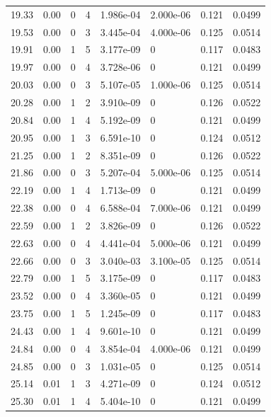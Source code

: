 \documentclass[preview]{standalone}
\begin{document}
{{{\begin{tabular}{L{1.2cm}C{1.2cm} C{0.3cm}C{0.5cm} C{1.4cm}C{1.4cm} C{1.4cm}C{1.4cm}}
  19.33  &  0.00  & 0     &  4 &  1.986e-04  & 2.000e-06  & 0.121 &  0.0499   \\ 
  19.53  &  0.00  & 0     &  3 &  3.445e-04  & 4.000e-06  & 0.125 &  0.0514   \\ 
  19.91  &  0.00  & 1     &  5 &  3.177e-09  & 0  & 0.117 &  0.0483   \\ 
  19.97  &  0.00  & 0     &  4 &  3.728e-06  & 0  & 0.121 &  0.0499   \\ 
  20.03  &  0.00  & 0     &  3 &  5.107e-05  & 1.000e-06  & 0.125 &  0.0514   \\ 
  20.28  &  0.00  & 1     &  2 &  3.910e-09  & 0  & 0.126 &  0.0522   \\ 
  20.84  &  0.00  & 1     &  4 &  5.192e-09  & 0  & 0.121 &  0.0499   \\ 
  20.95  &  0.00  & 1     &  3 &  6.591e-10  & 0  & 0.124 &  0.0512   \\ 
  21.25  &  0.00  & 1     &  2 &  8.351e-09  & 0  & 0.126 &  0.0522   \\ 
  21.86  &  0.00  & 0     &  3 &  5.207e-04  & 5.000e-06  & 0.125 &  0.0514   \\ 
  22.19  &  0.00  & 1     &  4 &  1.713e-09  & 0  & 0.121 &  0.0499   \\ 
  22.38  &  0.00  & 0     &  4 &  6.588e-04  & 7.000e-06  & 0.121 &  0.0499   \\ 
  22.59  &  0.00  & 1     &  2 &  3.826e-09  & 0  & 0.126 &  0.0522   \\ 
  22.63  &  0.00  & 0     &  4 &  4.441e-04  & 5.000e-06  & 0.121 &  0.0499   \\ 
  22.66  &  0.00  & 0     &  3 &  3.040e-03  & 3.100e-05  & 0.125 &  0.0514   \\ 
  22.79  &  0.00  & 1     &  5 &  3.175e-09  & 0  & 0.117 &  0.0483   \\ 
  23.52  &  0.00  & 0     &  4 &  3.360e-05  & 0  & 0.121 &  0.0499   \\ 
  23.75  &  0.00  & 1     &  5 &  1.245e-09  & 0  & 0.117 &  0.0483   \\ 
  24.43  &  0.00  & 1     &  4 &  9.601e-10  & 0  & 0.121 &  0.0499   \\ 
  24.84  &  0.00  & 0     &  4 &  3.854e-04  & 4.000e-06  & 0.121 &  0.0499   \\ 
  24.85  &  0.00  & 0     &  3 &  1.031e-05  & 0  & 0.125 &  0.0514   \\ 
  25.14  &  0.01  & 1     &  3 &  4.271e-09  & 0  & 0.124 &  0.0512   \\ 
  25.30  &  0.01  & 1     &  4 &  5.404e-10  & 0  & 0.121 &  0.0499   \\ 

\end{tabular}}}}
\end{document}
